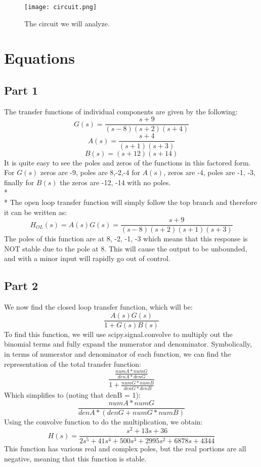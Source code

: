 \documentclass[12pt]{report}
\def\br{\hspace*{\fill} \\* }
\begin{document}
\begin{figure}[h]
   \centering
    \texttt{[image: circuit.png]}
    \caption{The circuit we will analyze.}
\end{figure}

\hypertarget{equations}{%
\chapter{Equations}\label{equations}}

\hypertarget{part-1}{%
\section{Part 1}\label{part-1}}

The transfer functions of individual components are given by the
following: \[ G(s)=\frac{s+9}{(s-8)(s+2)(s+4)} \]
\[ A(s)= \frac{s+4}{(s+1)(s+3)} \] \[ B(s)= (s+12)(s+14) \] It is quite
easy to see the poles and zeros of the functions in this factored form.
For \(G(s)\) zeros are -9, poles are 8,-2,-4 for \(A(s)\), zeros are -4,
poles are -1, -3, finally for \(B(s)\) the zeros are -12, -14 with no
poles. \br \br The open loop transfer function will simply follow the
top branch and therefore it can be written as:
\[ H_{OL}(s)=A(s)G(s)=\frac{s+9}{(s-8)(s+2)(s+1)(s+3)} \] The poles of
this function are at 8, -2, -1, -3 which means that this response is NOT
stable due to the pole at 8. This will cause the output to be unbounded,
and with a minor input will rapidly go out of control.

\hypertarget{part-2}{%
\section{Part 2}\label{part-2}}

We now find the closed loop transfer function, which will be:
\[ \frac{A(s)G(s)}{1+G(s)B(s)} \] To find this function, we will use
scipy.signal.convolve to multiply out the binomial terms and fully
expand the numerator and denominator. Symbolically, in terms of
numerator and denominator of each function, we can find the
representation of the total transfer function:
\[ \frac{\frac{numA*numG}{denA*denG}}{1+\frac{numG*numB}{denG*denB}} \]
Which simplifies to (noting that denB = 1):
\[ \frac{numA*numG}{denA*(denG+numG*numB)} \] Using the convolve
function to do the multiplication, we obtain:
\[ H(s)=\frac{s^2+13s+36}{2s^5+41s^4+500s^3+2995s^2+6878s+4344} \] This
function has various real and complex poles, but the real portions are
all negative, meaning that this function is stable.
\end{document}
